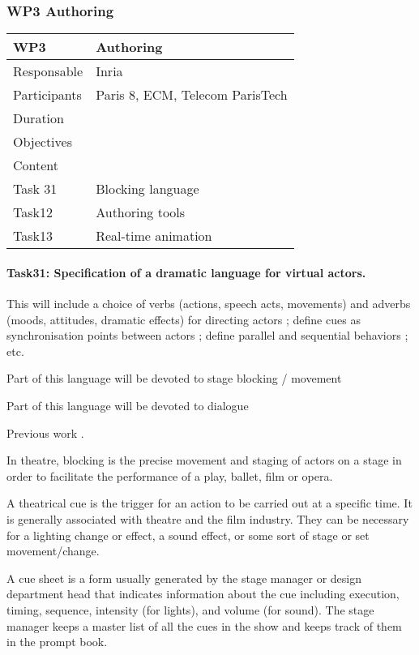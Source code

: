 \subsubsection{WP3 Authoring}


\begin{center}
\begin{tabular}{|l|l|}\hline
WP3 &  Authoring \\\hline
Responsable &  Inria  \\\hline
Participants &  Paris 8, ECM, Telecom ParisTech\\\hline
Duration  &   \\\hline
Objectives &   \\\hline
Content &  \\\hline
Task 31 & Blocking language  \\\hline
Task12 &  Authoring tools \\\hline
Task13 &  Real-time animation  \\\hline
\end{tabular}
\end{center}


\paragraph{Task31: Specification of a dramatic language for virtual actors.}

This will include a choice of verbs (actions, speech acts, movements) and adverbs (moods, attitudes, dramatic effects) 
for directing actors ; define cues as synchronisation points between actors ; define parallel and sequential behaviors ; etc.

Part of this language will be devoted to stage blocking / movement

Part of this language will be devoted to dialogue

Previous work \cite{gagnere2012,ronfard2012,gagnere2015}.

In theatre, blocking is the precise movement and staging of actors on a stage in order to facilitate the performance of a play, ballet, film or opera.

A theatrical cue is the trigger for an action to be carried out at a specific time. It is generally associated with theatre and the film industry. They can be necessary for a lighting change or effect, a sound effect, or some sort of stage or set movement/change.

A cue sheet is a form usually generated by the stage manager or design department head that indicates information about the cue including execution, timing, sequence, intensity (for lights), and volume (for sound). The stage manager keeps a master list of all the cues in the show and keeps track of them in the prompt book.


